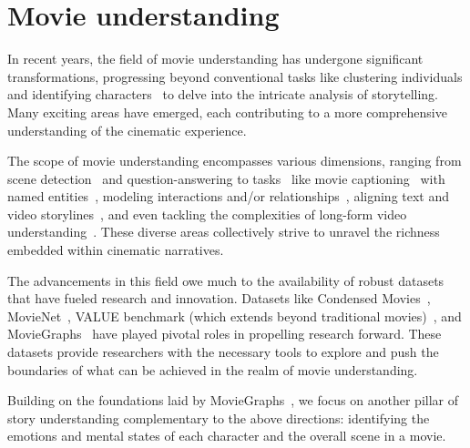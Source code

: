 \section{Movie understanding}
\label{sec:movieUnderstanding}
In recent years, the field of movie understanding has undergone significant transformations, progressing beyond conventional tasks like clustering individuals and identifying characters~\cite{buffy, knock_knock, face_body_voice, brown2021corroborative, c1c, nagrani2017sherlock} to delve into the intricate analysis of storytelling. Many exciting areas have emerged, each contributing to a more comprehensive understanding of the cinematic experience.

The scope of movie understanding encompasses various dimensions, ranging from scene detection~\cite{local2global_sceneseg, chen2021shotcol, rotman2017osg,  rasheed2003scenedet, tapaswi2014storygraphs} and question-answering to tasks~\cite{movieqa, tvqa, yu2018jsfusion} like movie captioning~\cite{lsmdc, yu2017concepts} with named entities~\cite{fillin}, modeling interactions and/or relationships~\cite{fan2019understanding, marin2019laeo, lirec}, aligning text and video storylines~\cite{book2movie, book_movie_uoft, graph_movienet}, and even tackling the complexities of long-form video understanding~\cite{lvu}. These diverse areas collectively strive to unravel the richness embedded within cinematic narratives.

The advancements in this field owe much to the availability of robust datasets that have fueled research and innovation. Datasets like Condensed Movies~\cite{condensed_movies}, MovieNet~\cite{movienet}, VALUE benchmark (which extends beyond traditional movies)~\cite{value_benchmark}, and MovieGraphs~\cite{moviegraphs} have played pivotal roles in propelling research forward. These datasets provide researchers with the necessary tools to explore and push the boundaries of what can be achieved in the realm of movie understanding.

Building on the foundations laid by MovieGraphs~\cite{moviegraphs}, we focus on another pillar of story understanding complementary to the above directions: identifying the emotions and mental states of each character and the overall scene in a movie.

